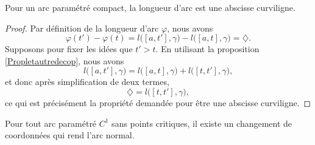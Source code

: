 \begin{lemma}
Pour un arc paramétré compact, la longueur d'arc est une abscisse curviligne.
\end{lemma}

\begin{proof}
Par définition de la longueur d'arc $\varphi$, nous avons
\begin{equation}
    \varphi(t')-\varphi(t)=l\big( [a,t'],\gamma \big)-l\big( [a,t],\gamma \big)=\diamondsuit.
\end{equation}
Supposons pour fixer les idées que $t'>t$. En utilisant la proposition \ref{Propletautredecop}, nous avons
\begin{equation}
    l\big( [a,t'],\gamma \big)=l\big( [a,t],\gamma \big)+l\big( [t,t'],\gamma \big),
\end{equation}
et donc après simplification de deux termes,
\begin{equation}
    \diamondsuit=l\big( [t,t'],\gamma \big),
\end{equation}
ce qui est précisément la propriété demandée pour être une abscisse curviligne.
\end{proof}

\begin{proposition}     \label{PropExisteChmNorm}
Pour tout arc paramétré $C^1$ sans points critiques, il existe un changement de coordonnées qui rend l'arc normal.
\end{proposition}

